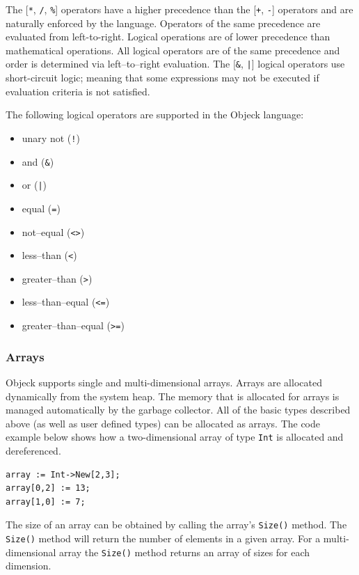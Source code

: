 \documentclass[11pt]{article}
\begin{document}
The [\texttt{*}, \texttt{/}, \texttt{\%}] operators have a higher
precedence than the [\texttt{+}, \texttt{-}] operators and are
naturally enforced by the language. Operators of the same precedence
are evaluated from left-to-right.  Logical operations are of lower
precedence than mathematical operations. All logical operators are of
the same precedence and order is determined via left--to--right
evaluation.  The [\texttt{\&}, \texttt{|}] logical operators use
short-circuit logic; meaning that some expressions may not be executed
if evaluation criteria is not satisfied.

The following logical operators are supported in the Objeck language:
\begin{itemize}
\item unary not (\texttt{!})
\item and (\texttt{\&})
\item or (\texttt{|})
\item equal (\texttt{=})
\item not--equal (\texttt{<>})
\item less--than (\texttt{<})
\item greater--than (\texttt{>})
\item less--than--equal (\texttt{<=})
\item greater--than--equal (\texttt{>=})
\end{itemize}

\subsubsection{Arrays}
Objeck supports single and multi-dimensional arrays.  Arrays are
allocated dynamically from the system heap.  The memory that is
allocated for arrays is managed automatically by the garbage
collector.  All of the basic types described above (as well as user
defined types) can be allocated as arrays.  The code example below
shows how a two-dimensional array of type \texttt{Int} is allocated
and dereferenced.

\begin{verbatim}
array := Int->New[2,3];
array[0,2] := 13;
array[1,0] := 7;
\end{verbatim}

The size of an array can be obtained by calling the array's
\texttt{Size()} method.  The \texttt{Size()} method will return the
number of elements in a given array.  For a multi-dimensional array
the \texttt{Size()} method returns an array of sizes for each
dimension. 
\end{document}
